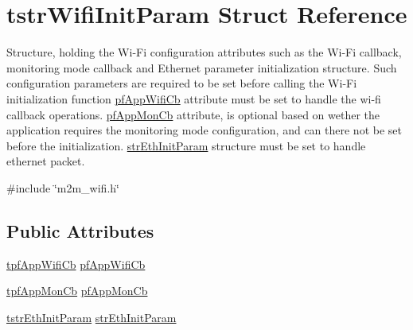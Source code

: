 \hypertarget{structtstrWifiInitParam}{}\section{tstr\+Wifi\+Init\+Param Struct Reference}
\label{structtstrWifiInitParam}


Structure, holding the Wi-\/\+Fi configuration attributes such as the Wi-\/\+Fi callback, monitoring mode callback and Ethernet parameter initialization structure. Such configuration parameters are required to be set before calling the Wi-\/\+Fi initialization function \hyperlink{group__WifiSetCustInfoElementFn_ga13d5fa7a0c71fd59bbf36a61923835cc}{pf\+App\+Wifi\+Cb} attribute must be set to handle the wi-\/fi callback operations. \hyperlink{group__WifiSetCustInfoElementFn_gabbd16bbde19ebb6cea2ff732b84421e8}{pf\+App\+Mon\+Cb} attribute, is optional based on wether the application requires the monitoring mode configuration, and can there not be set before the initialization. \hyperlink{group__WifiSetCustInfoElementFn_gac72757e663d13b9c446735a5dca54eb1}{str\+Eth\+Init\+Param} structure must be set to handle ethernet packet.  




{\ttfamily \#include \char`\"{}m2m\+\_\+wifi.\+h\char`\"{}}

\subsection*{Public Attributes}
\begin{DoxyCompactItemize}
\item 
\hyperlink{group__WlanEnums_gac5302f32839285fe8375c159087aa8a1}{tpf\+App\+Wifi\+Cb} \hyperlink{group__WifiSetCustInfoElementFn_ga13d5fa7a0c71fd59bbf36a61923835cc}{pf\+App\+Wifi\+Cb}
\item 
\hyperlink{group__WlanEnums_ga8d2753e870245dad4932cee1777c6eb6}{tpf\+App\+Mon\+Cb} \hyperlink{group__WifiSetCustInfoElementFn_gabbd16bbde19ebb6cea2ff732b84421e8}{pf\+App\+Mon\+Cb}
\item 
\hyperlink{structtstrEthInitParam}{tstr\+Eth\+Init\+Param} \hyperlink{group__WifiSetCustInfoElementFn_gac72757e663d13b9c446735a5dca54eb1}{str\+Eth\+Init\+Param}
\end{DoxyCompactItemize}


